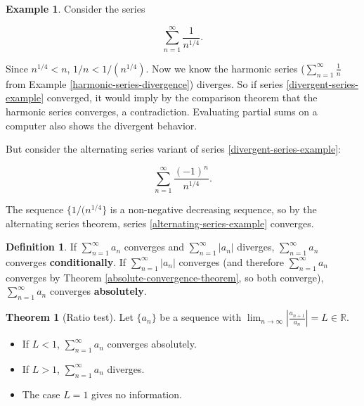 \documentclass{article}
\theoremstyle{definition}
\newtheorem{definition}{Definition}[section]
\newtheorem{example}{Example}[section]
\newtheorem{theorem}{Theorem}[section]
\begin{document}
\begin{example}
Consider the series

\begin{equation} \label{divergent-series-example}
\sum\limits_{n=1}^\infty \frac{1}{n^{1/4}}.
\end{equation}

Since $n^{1/4} < n$, $1/n < 1/(n^{1/4})$. Now we know the harmonic series ($\sum\limits_{n=1}^\infty \frac{1}{n}$ from Example \ref{harmonic-series-divergence}) diverges. So if series \ref{divergent-series-example} converged, it would imply by the comparison theorem that the harmonic series converges, a contradiction. Evaluating partial sums on a computer also shows the divergent behavior.

But consider the alternating series variant of series \ref{divergent-series-example}:

\begin{equation} \label{alternating-series-example}
\sum\limits_{n=1}^\infty \frac{(-1)^n}{n^{1/4}}.
\end{equation}

The sequence $\{1/(n^{1/4}\}$ is a non-negative decreasing sequence, so by the alternating series theorem, series \ref{alternating-series-example} converges.
\end{example}

\begin{definition}
If  $\sum\limits_{n=1}^\infty a_n$ converges and  $\sum\limits_{n=1}^\infty |a_n|$ diverges,  $\sum\limits_{n=1}^\infty a_n$ converges \textbf{conditionally}. If  $\sum\limits_{n=1}^\infty |a_n|$ converges (and therefore  $\sum\limits_{n=1}^\infty a_n$ converges by Theorem \ref{absolute-convergence-theorem}, so both converge), $\sum\limits_{n=1}^\infty a_n$ converges \textbf{absolutely}.
\end{definition}

\begin{theorem}[Ratio test]
Let $\{a_n\}$ be a sequence with $\lim_{n \to \infty} |\frac{a_{n+1}}{a_n}| = L \in \mathbb{R}$.

\begin{itemize}
\item If $L < 1$, $\sum\limits_{n=1}^\infty a_n$ converges absolutely.
\item If $L > 1$, $\sum\limits_{n=1}^\infty a_n$ diverges.
\item The case $L = 1$ gives no information.
\end{itemize}
\end{theorem}
\end{document}
